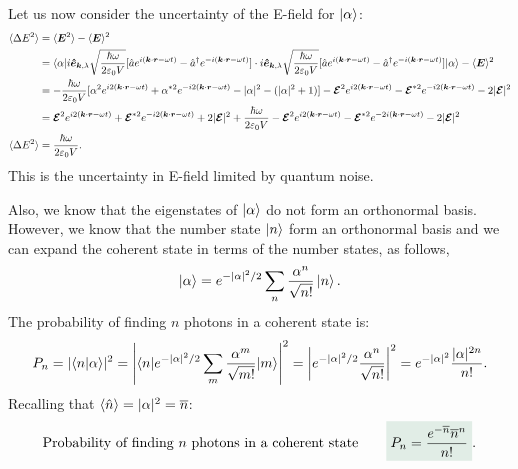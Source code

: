 Let us now consider the uncertainty of the E-field for $\left|\alpha\right\rangle$:
\begin{align*}
    \langle\Delta E^2\rangle&=\langle\bm{E}^2\rangle-\langle\bm{E}\rangle^2\\
    &=\langle\alpha|i\bm{\hat{e}}_{\bm{k},\lambda}\sqrt{\frac{\hbar\omega}{2\varepsilon_0V}}[\hat{a} e^{i(\bm{k}\cdot\bm{r}-\omega t)}
    -\hat{a}^\dagger e^{-i(\bm{k}\cdot\bm{r}-\omega t)}]\cdot i\bm{\hat{e}}_{\bm{k},\lambda}\sqrt{\frac{\hbar\omega}{2\varepsilon_0V}}[\hat{a} e^{i(\bm{k}\cdot\bm{r}-\omega t)}
    -\hat{a}^\dagger e^{-i(\bm{k}\cdot\bm{r}-\omega t)}]|\alpha\rangle-\langle\bm{E}\rangle^2\\
    &=-\frac{\hbar\omega}{2\varepsilon_0V}[\alpha^2e^{i2(\bm{k}\cdot\bm{r}-\omega t)}+\alpha^{*2}e^{-i2(\bm{k}\cdot\bm{r}-\omega t)}-|\alpha|^2-(|\alpha|^2+1)]
    -\bm{\mathcal{E}}^2e^{i2(\bm{k}\cdot\bm{r}-\omega t)}-\bm{\mathcal{E}}^{*2}e^{-i2(\bm{k}\cdot\bm{r}-\omega t)}-2|\bm{\mathcal{E}}|^2\\
    &=\bm{\mathcal{E}}^2e^{i2(\bm{k}\cdot\bm{r}-\omega t)}+\bm{\mathcal{E}}^{*2}e^{-i2(\bm{k}\cdot\bm{r}-\omega t)}+2|\bm{\mathcal{E}}|^2+\frac{\hbar\omega}{2\varepsilon_0V}
    -\bm{\mathcal{E}}^2e^{i2(\bm{k}\cdot\bm{r}-\omega t)}-\bm{\mathcal{E}}^{*2}e^{-2i(\bm{k}\cdot\bm{r}-\omega t)}-2|\bm{\mathcal{E}}|^2\\
    \langle\Delta E^2\rangle&=\frac{\hbar\omega}{2\varepsilon_0V}.
\end{align*}
This is the uncertainty in E-field limited by quantum noise.

Also, we know that the eigenstates of $\left|\alpha\right\rangle$ do not form an orthonormal basis. However, we know that the number state $\left|n\right\rangle$ form an orthonormal 
basis and we can expand the coherent state in terms of the number states, as follows,
\begin{align*}
    \left|\alpha\right\rangle=e^{-|\alpha|^2/2}\sum_n\frac{\alpha^n}{\sqrt{n!}}\left|n\right\rangle.
\end{align*}
The probability of finding $n$ photons in a coherent state is:
\begin{align*}
    P_n=|\langle n|\alpha\rangle|^2=\left|\langle n|e^{-|\alpha|^2/2}\sum_m\frac{\alpha^m}{\sqrt{m!}}|m\rangle\right|^2=\left|e^{-|\alpha|^2/2}\frac{\alpha^n}{\sqrt{n!}}\right|^2=e^{-|\alpha|^2}\frac{|\alpha|^{2n}}{n!}.
\end{align*}
Recalling that $\langle\hat{n}\rangle=|\alpha|^2=\overline{n}$:
\begin{align*}
    \text{Probability of finding $n$ photons in a coherent state}\qquad\highlight{P_n=\frac{e^{-\overline{n}}\overline{n}^n}{n!}}.
\end{align*}
